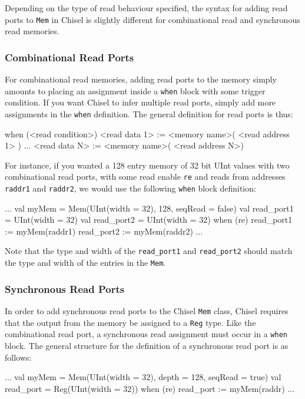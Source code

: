 \documentclass[twocolumn, 10pt]{article}
\begin{document}
Depending on the type of read behaviour specified, the syntax for adding read ports to \verb+Mem+ in Chisel is slightly different for combinational read and synchronous read memories.

\subsubsection{Combinational Read Ports}

For combinational read memories, adding read ports to the memory simply amounts to placing an assignment inside a \verb+when+ block with some trigger condition. If you want Chisel to infer multiple read ports, simply add more assignments in the \verb+when+ definition. The general definition for read ports is thus:

\begin{scala}
when (<read condition>) {
  <read data 1> := <memory name>( <read address 1> )
  ...
  <read data N> := <memory name>( <read address N>)
}
\end{scala}

For instance, if you wanted a 128 entry memory of 32 bit UInt values with two combinational read ports, with some read enable \verb+re+ and reads from addresses \verb+raddr1+ and \verb+raddr2+, we would use the following \verb+when+ block definition:

\begin{scala}
...
val myMem = Mem(UInt(width = 32), 128, seqRead = false)
val read_port1 = UInt(width = 32)
val read_port2 = UInt(width = 32)
when (re) {
  read_port1 := myMem(raddr1)
  read_port2 := myMem(raddr2)
}
...
\end{scala}

Note that the type and width of the \verb+read_port1+ and \verb+read_port2+ should match the type and width of the entries in the \verb+Mem+.

\subsubsection{Synchronous Read Ports}

In order to add synchronous read ports to the Chisel \verb+Mem+ class, Chisel requires that the output from the memory be assigned to a \verb+Reg+ type. Like the combinational read port, a synchronous read assignment must occur in a \verb+when+ block. The general structure for the definition of a synchronous read port is as follows:

\begin{scala}
...
val myMem = Mem(UInt(width = 32), depth = 128, seqRead = true)
val read_port = Reg(UInt(width = 32))
when (re) {
  read_port := myMem(raddr)
}
...
\end{scala}
\end{document}
